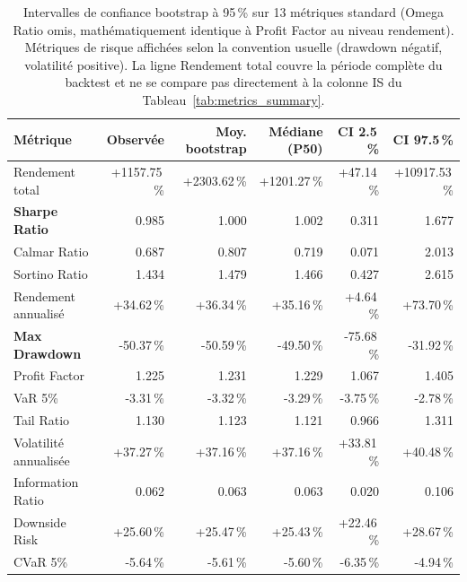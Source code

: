 \begin{table}[H]
\centering
\caption{Intervalles de confiance bootstrap à 95\,\% sur 13 métriques standard (Omega Ratio omis, mathématiquement identique à Profit Factor au niveau rendement). Métriques de risque affichées selon la convention usuelle (drawdown négatif, volatilité positive). La ligne Rendement total couvre la période complète du backtest et ne se compare pas directement à la colonne IS du Tableau~\ref{tab:metrics_summary}.}
\label{tab:robustness_bootstrap_ci}
\begin{tabular}{lrrrrr}
\toprule
Métrique & Observée & Moy. bootstrap & Médiane (P50) & CI 2.5\,\% & CI 97.5\,\% \\
\midrule
Rendement total & +1157.75\,\% & +2303.62\,\% & +1201.27\,\% & +47.14\,\% & +10917.53\,\% \\
\textbf{Sharpe Ratio} & 0.985 & 1.000 & 1.002 & 0.311 & 1.677 \\
Calmar Ratio & 0.687 & 0.807 & 0.719 & 0.071 & 2.013 \\
Sortino Ratio & 1.434 & 1.479 & 1.466 & 0.427 & 2.615 \\
Rendement annualisé & +34.62\,\% & +36.34\,\% & +35.16\,\% & +4.64\,\% & +73.70\,\% \\
\textbf{Max Drawdown} & -50.37\,\% & -50.59\,\% & -49.50\,\% & -75.68\,\% & -31.92\,\% \\
Profit Factor & 1.225 & 1.231 & 1.229 & 1.067 & 1.405 \\
VaR 5\% & -3.31\,\% & -3.32\,\% & -3.29\,\% & -3.75\,\% & -2.78\,\% \\
Tail Ratio & 1.130 & 1.123 & 1.121 & 0.966 & 1.311 \\
Volatilité annualisée & +37.27\,\% & +37.16\,\% & +37.16\,\% & +33.81\,\% & +40.48\,\% \\
Information Ratio & 0.062 & 0.063 & 0.063 & 0.020 & 0.106 \\
Downside Risk & +25.60\,\% & +25.47\,\% & +25.43\,\% & +22.46\,\% & +28.67\,\% \\
CVaR 5\% & -5.64\,\% & -5.61\,\% & -5.60\,\% & -6.35\,\% & -4.94\,\% \\
\bottomrule
\end{tabular}
\end{table}
